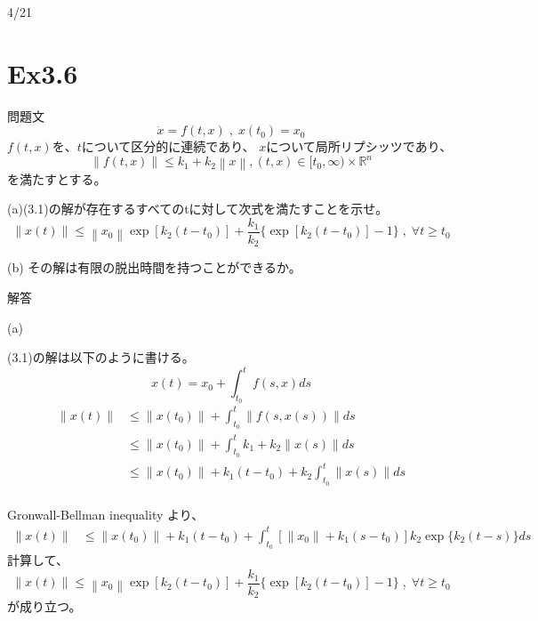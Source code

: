 \documentclass{jsarticle}
\begin{document}
4/21

\section*{Ex3.6}
問題文\\
\begin{equation}
  \dot x = f(t,x)\;,\;x(t_0) = x_0 \tag{3.1}
\end{equation}
$f(t, x)$を、$t$について区分的に連続であり、
$x$について局所リプシッツであり、
\begin{equation*}
  \left\|f(t, x)\right\|\leq k_1 + k_2\left\|x\right\|, (t, x)\in [t_0,\infty)\times \mathbb{R}^n
\end{equation*}
を満たすとする。

(a)(3.1)の解が存在するすべてのtに対して次式を満たすことを示せ。
\begin{equation*}
  \left\|x(t)\right\|\leq \left\|x_0\right\|\exp\left[k_2(t-t_0)\right]+\frac{k_1}{k_2}\{\exp\left[k_2(t-t_0)\right]-1\}\;,\;\forall t\geq t_0
\end{equation*}

(b) その解は有限の脱出時間を持つことができるか。

\vspace*{1cm}

解答

(a) 

(3.1)の解は以下のように書ける。
\begin{equation*}
  x(t) = x_0 + \int^t_{t_0} f(s,x) ds
\end{equation*}
$$
\begin{aligned}
  \|x(t)\| &\leq \|x(t_0)\| + \int_{t_0}^{t} \|f(s,x(s))\| ds \\
  &\leq \|x(t_0)\| + \int_{t_0}^{t} k_1 + k_2\|x(s)\| ds \\
  &\leq \|x(t_0)\| + k_1(t-t_0) + k_2 \int_{t_0}^{t} \|x(s)\| ds \\
\end{aligned}
$$

Gronwall-Bellman inequality より、
$$
\begin{aligned}
  \|x(t)\|&\leq \|x(t_0)\| + k_1(t-t_0) + \int_{t_0}^{t}[\|x_0\| + k_1(s-t_0)]k_2 \exp\{k_2(t-s)\} ds 
\end{aligned}
$$
計算して、
\begin{equation*}
  \left\|x(t)\right\|\leq \left\|x_0\right\|\exp\left[k_2(t-t_0)\right]+\frac{k_1}{k_2}\{\exp\left[k_2(t-t_0)\right]-1\}\;,\;\forall t\geq t_0
\end{equation*}
が成り立つ。
\end{document}
